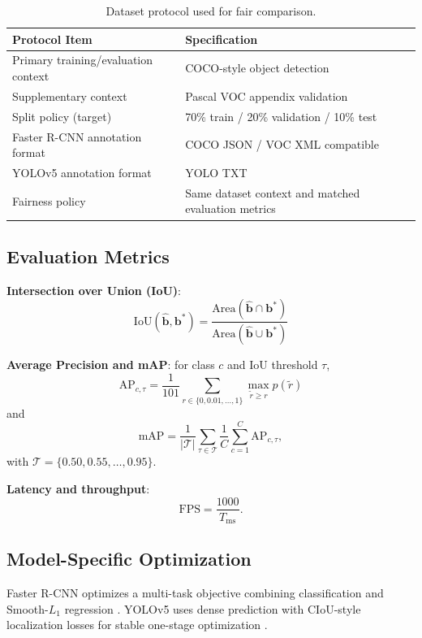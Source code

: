 \documentclass[conference]{IEEEtran}
\begin{document}
\begin{table}[!t]
\centering
\caption{Dataset protocol used for fair comparison.}
\label{tab:dataset-protocol}
\begin{tabular}{p{}p{}}
\toprule
\textbf{Protocol Item} & \textbf{Specification} \\
\midrule
Primary training/evaluation context & COCO-style object detection \\
Supplementary context & Pascal VOC appendix validation \\
Split policy (target) & 70\% train / 20\% validation / 10\% test \\
Faster R-CNN annotation format & COCO JSON / VOC XML compatible \\
YOLOv5 annotation format & YOLO TXT \\
Fairness policy & Same dataset context and matched evaluation metrics \\
\bottomrule
\end{tabular}
\end{table}

\subsection{Evaluation Metrics}
\textbf{Intersection over Union (IoU)}:
\begin{equation}
\mathrm{IoU}(\hat{\mathbf{b}},\mathbf{b}^{*})=
\frac{\mathrm{Area}(\hat{\mathbf{b}}\cap\mathbf{b}^{*})}{\mathrm{Area}(\hat{\mathbf{b}}\cup\mathbf{b}^{*})}
\end{equation}

\textbf{Average Precision and mAP}: for class $c$ and IoU threshold $\tau$,
\begin{equation}
\mathrm{AP}_{c,\tau}=\frac{1}{101}\sum_{r\in\{0,0.01,\dots,1\}}\max_{\tilde r\ge r}p(\tilde r)
\end{equation}
and
\begin{equation}
\mathrm{mAP}=\frac{1}{|\mathcal{T}|}\sum_{\tau\in\mathcal{T}}\frac{1}{C}\sum_{c=1}^{C}\mathrm{AP}_{c,\tau},
\end{equation}
with $\mathcal{T}=\{0.50,0.55,\dots,0.95\}$.

\textbf{Latency and throughput}:
\begin{equation}
\mathrm{FPS}=\frac{1000}{T_{\mathrm{ms}}}.
\end{equation}

\subsection{Model-Specific Optimization}
Faster R-CNN optimizes a multi-task objective combining classification and Smooth-$L_1$ regression \cite{ren2015faster}. YOLOv5 uses dense prediction with CIoU-style localization losses for stable one-stage optimization \cite{yolov5}.
\end{document}
